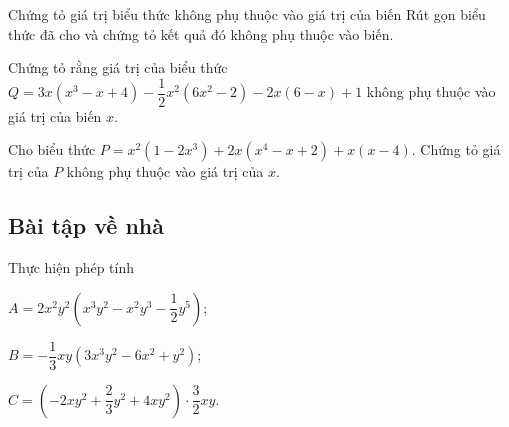 \begin{dang}{Chứng tỏ giá trị biểu thức không phụ thuộc vào giá trị của biến}
Rút gọn biểu thức đã cho và chứng tỏ kết quả đó không phụ thuộc vào biến.
\end{dang}
\begin{vd}%
    Chứng tỏ rằng giá trị của biểu thức $ Q=3x(x^3-x+4)-\dfrac{1}{2}x^2(6x^2-2)-2x(6-x)+1 $ không phụ thuộc vào giá trị của biến $x$.
\end{vd}
\begin{vd}%
    Cho biểu thức $P=x^2(1-2x^3)+2x(x^4-x+2)+x(x-4)$. Chứng tỏ giá trị của $P$ không phụ thuộc vào giá trị của $x$.
\end{vd}
\subsection{Bài tập về nhà}

\begin{bt}%
	Thực hiện phép tính
	\begin{listEX}[2]
		\item $A=2x^2y^2\left(x^3y^2-x^2y^3-\dfrac{1}{2}y^5\right)$;
		\item $B=-\dfrac{1}{3}xy(3x^3y^2-6x^2+y^2)$;
		\item $C=\left(-2xy^2+\dfrac{2}{3}y^2+4xy^2\right)\cdot\dfrac{3}{2}xy$.
	\end{listEX}
\end{bt}

